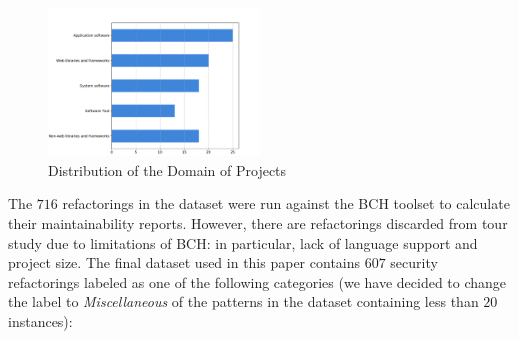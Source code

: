 \documentclass[10pt,conference]{IEEEtran}
\begin{document}
\begin{figure}[h]
 	\centering 	\includegraphics[width=0.5\textwidth]{figures/type_dist.pdf}
 	\caption{Distribution of the Domain of Projects}
	\label{fig:domain}
\end{figure}



The $716$ refactorings in the dataset were run against the BCH toolset to
calculate their maintainability reports. However, there are refactorings
discarded from tour study due to limitations of BCH: in particular, lack of
language support and project size. The final dataset used in this paper contains
$607$ security refactorings labeled as one of the following categories (we
have decided to change the label to \textit{Miscellaneous} of the patterns in
the dataset containing less than $20$ instances):
\end{document}
